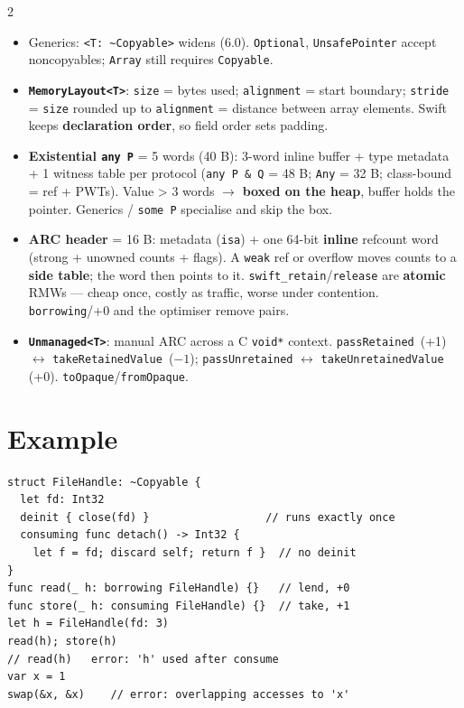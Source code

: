 \documentclass[8pt]{extarticle}
\begin{document}
\begin{multicols}{2}
\begin{itemize}
        \texttt{discard self} ends it \emph{without} \texttt{deinit}.
  \item Generics: \texttt{<T: \textasciitilde Copyable>} widens (6.0).
        \texttt{Optional}, \texttt{UnsafePointer} accept noncopyables;
        \texttt{Array} still requires \texttt{Copyable}.
  \item \textbf{\texttt{MemoryLayout<T>}}: \texttt{size} = bytes used;
        \texttt{alignment} = start boundary; \texttt{stride} = \texttt{size}
        rounded up to \texttt{alignment} = distance between array elements.
        Swift keeps \textbf{declaration order}, so field order sets padding.
  \item \textbf{Existential \texttt{any P}} = 5 words (40 B): 3-word inline
        buffer + type metadata + 1 witness table per protocol
        (\texttt{any P \& Q} = 48 B; \texttt{Any} = 32 B; class-bound = ref +
        PWTs). Value > 3 words $\to$ \textbf{boxed on the heap}, buffer holds the
        pointer. Generics / \texttt{some P} specialise and skip the box.
  \item \textbf{ARC header} = 16 B: metadata (\texttt{isa}) + one 64-bit
        \textbf{inline} refcount word (strong + unowned counts + flags). A
        \texttt{weak} ref or overflow moves counts to a \textbf{side table};
        the word then points to it. \texttt{swift\_retain}/\texttt{release}
        are \textbf{atomic} RMWs — cheap once, costly as traffic, worse under
        contention. \texttt{borrowing}/+0 and the optimiser remove pairs.
  \item \textbf{\texttt{Unmanaged<T>}}: manual ARC across a C \texttt{void*}
        context. \texttt{passRetained}~(+1) $\leftrightarrow$
        \texttt{takeRetainedValue}~($-1$); \texttt{passUnretained} $\leftrightarrow$
        \texttt{takeUnretainedValue} (+0). \texttt{toOpaque}/\texttt{fromOpaque}.
\end{itemize}

\section{Example}
\begin{lstlisting}[language=SwiftSheet]
struct FileHandle: ~Copyable {
  let fd: Int32
  deinit { close(fd) }                  // runs exactly once
  consuming func detach() -> Int32 {
    let f = fd; discard self; return f }  // no deinit
}
func read(_ h: borrowing FileHandle) {}   // lend, +0
func store(_ h: consuming FileHandle) {}  // take, +1
let h = FileHandle(fd: 3)
read(h); store(h)
// read(h)   error: 'h' used after consume
var x = 1
swap(&x, &x)    // error: overlapping accesses to 'x'
\end{lstlisting}


\end{multicols}
\end{document}
